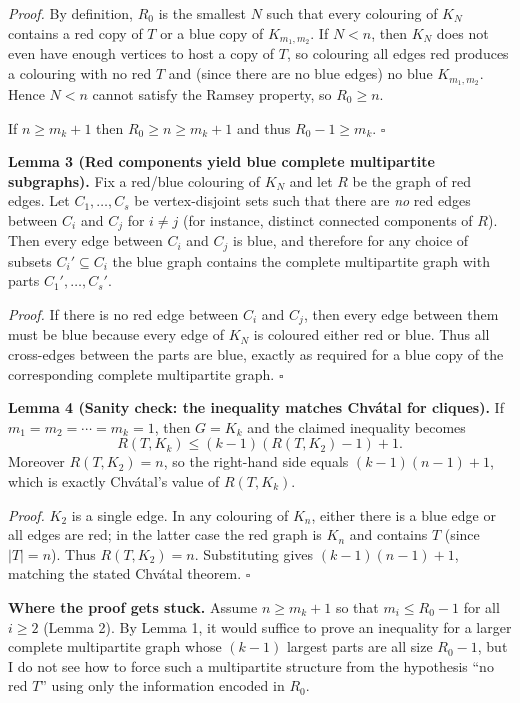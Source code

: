 \emph{Proof.}
By definition, $R_0$ is the smallest $N$ such that every colouring of $K_N$ contains a red copy of $T$ or a blue copy of $K_{m_1,m_2}$. If $N<n$, then $K_N$ does not even have enough vertices to host a copy of $T$, so colouring all edges red produces a colouring with no red $T$ and (since there are no blue edges) no blue $K_{m_1,m_2}$. Hence $N<n$ cannot satisfy the Ramsey property, so $R_0\ge n$.

If $n\ge m_k+1$ then $R_0\ge n\ge m_k+1$ and thus $R_0-1\ge m_k$. $\square$

\textbf{Lemma 3 (Red components yield blue complete multipartite subgraphs).}
Fix a red/blue colouring of $K_N$ and let $R$ be the graph of red edges. Let $C_1,\dots,C_s$ be vertex-disjoint sets such that there are \emph{no} red edges between $C_i$ and $C_j$ for $i\neq j$ (for instance, distinct connected components of $R$).
Then every edge between $C_i$ and $C_j$ is blue, and therefore for any choice of subsets $C_i'\subseteq C_i$ the blue graph contains the complete multipartite graph with parts $C_1',\dots,C_s'$.

\emph{Proof.}
If there is no red edge between $C_i$ and $C_j$, then every edge between them must be blue because every edge of $K_N$ is coloured either red or blue. Thus all cross-edges between the parts are blue, exactly as required for a blue copy of the corresponding complete multipartite graph. $\square$

\textbf{Lemma 4 (Sanity check: the inequality matches Chv\'atal for cliques).}
If $m_1=m_2=\cdots=m_k=1$, then $G=K_k$ and the claimed inequality becomes
\[
R(T,K_k)\le (k-1)(R(T,K_2)-1)+1.
\]
Moreover $R(T,K_2)=n$, so the right-hand side equals $(k-1)(n-1)+1$, which is exactly Chv\'atal's value of $R(T,K_k)$.

\emph{Proof.}
$K_2$ is a single edge. In any colouring of $K_n$, either there is a blue edge or all edges are red; in the latter case the red graph is $K_n$ and contains $T$ (since $|T|=n$). Thus $R(T,K_2)=n$.
Substituting gives $(k-1)(n-1)+1$, matching the stated Chv\'atal theorem. $\square$

\textbf{Where the proof gets stuck.}
Assume $n\ge m_k+1$ so that $m_i\le R_0-1$ for all $i\ge 2$ (Lemma 2). By Lemma 1, it would suffice to prove an inequality for a larger complete multipartite graph whose $(k-1)$ largest parts are all size $R_0-1$, but I do not see how to force such a multipartite structure from the hypothesis “no red $T$” using only the information encoded in $R_0$.

